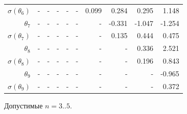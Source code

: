 \documentclass{matmex-diploma-custom}
\begin{document}
\begin{table}[h!!]
\begin{tabular}{r|rr|rrr|rrrr}
 $\sigma(\theta_6)$&-    &    - &    - &    - &    - &   0.099 &    0.284 &    0.295 &    1.148 \\
 $\theta_7$&-     &    - &    - &    - &    - &    - &  -0.331 &   -1.047 &   -1.254 \\
 $ \sigma(\theta_7)$&-     &    - &    - &    - &    - &    - &     0.135 &    0.444 &    0.475 \\
 $\theta_8$&-     &    - &    - &    - &    - &    - &    - &   0.336 &    2.521 \\
 $ \sigma(\theta_8)$&-     &    - &    - &    - &    - &    - &    - &    0.196 &    0.843 \\
 $\theta_9$&-     &    - &    - &    - &    - &    - &    - &    - &  -0.965  \\
 $ \sigma(\theta_9)$&-     &    - &    - &    - &    - &    - &    - &    - &   0.372  \\
\end{tabular}
\end{table}

Допустимые $n = 3 .. 5$.
\pagebreak
%
%
%
%
\pagebreak
\end{document}
